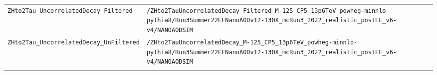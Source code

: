 \begin{longtable}{@{}>{\RaggedRight\arraybackslash}p{} >{\RaggedRight\arraybackslash}p{}@{}}
\addlinespace[2pt]
\texttt{ZHto2Tau\_\allowbreak{}UncorrelatedDecay\_\allowbreak{}Filtered} & \texttt{/\allowbreak{}ZHto2TauUncorrelatedDecay\_\allowbreak{}Filtered\_\allowbreak{}M-\allowbreak{}125\_\allowbreak{}CP5\_\allowbreak{}13p6TeV\_\allowbreak{}powheg-\allowbreak{}minnlo-\allowbreak{}pythia8/\allowbreak{}Run3Summer22EENanoAODv12-\allowbreak{}130X\_\allowbreak{}mcRun3\_\allowbreak{}2022\_\allowbreak{}realistic\_\allowbreak{}postEE\_\allowbreak{}v6-\allowbreak{}v4/\allowbreak{}NANOAODSIM} \\
\addlinespace[2pt]
\texttt{ZHto2Tau\_\allowbreak{}UncorrelatedDecay\_\allowbreak{}UnFiltered} & \texttt{/\allowbreak{}ZHto2TauUncorrelatedDecay\_\allowbreak{}M-\allowbreak{}125\_\allowbreak{}CP5\_\allowbreak{}13p6TeV\_\allowbreak{}powheg-\allowbreak{}minnlo-\allowbreak{}pythia8/\allowbreak{}Run3Summer22EENanoAODv12-\allowbreak{}130X\_\allowbreak{}mcRun3\_\allowbreak{}2022\_\allowbreak{}realistic\_\allowbreak{}postEE\_\allowbreak{}v6-\allowbreak{}v4/\allowbreak{}NANOAODSIM} \\
\addlinespace[2pt]
\end{longtable}
